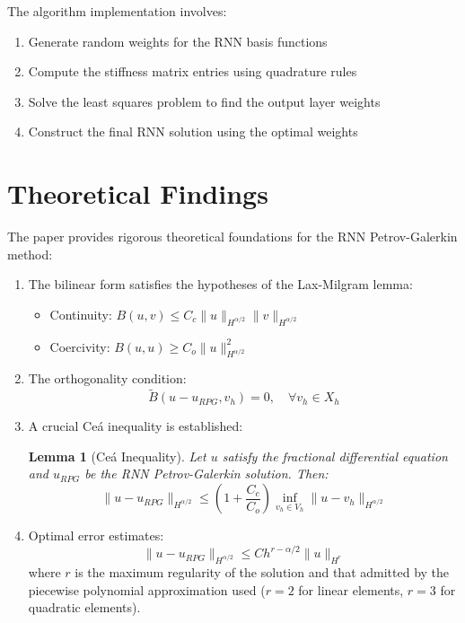\documentclass[11pt]{article}
\newtheorem{lemma}{Lemma}
\begin{document}
The algorithm implementation involves:
\begin{enumerate}
    \item Generate random weights for the RNN basis functions
    \item Compute the stiffness matrix entries using quadrature rules
    \item Solve the least squares problem to find the output layer weights
    \item Construct the final RNN solution using the optimal weights
\end{enumerate}

\section{Theoretical Findings}

The paper provides rigorous theoretical foundations for the RNN Petrov-Galerkin method:

\begin{enumerate}
    \item The bilinear form satisfies the hypotheses of the Lax-Milgram lemma:
    \begin{itemize}
        \item Continuity: $B(u,v) \leq C_c \|u\|_{H^{\alpha/2}} \|v\|_{H^{\alpha/2}}$
        \item Coercivity: $B(u,u) \geq C_o \|u\|^2_{H^{\alpha/2}}$
    \end{itemize}
    
    \item The orthogonality condition:
    \begin{equation}
    \tilde{B}(u-u_{RPG}, v_h) = 0, \quad \forall v_h \in X_h
    \end{equation}
    
    \item A crucial Ceá inequality is established:
    \begin{lemma}[Ceá Inequality]
    Let $u$ satisfy the fractional differential equation and $u_{RPG}$ be the RNN Petrov-Galerkin solution. Then:
    \begin{equation}
    \|u-u_{RPG}\|_{H^{\alpha/2}} \leq \left(1 + \frac{C_c}{C_o}\right) \inf_{v_h \in V_h} \|u-v_h\|_{H^{\alpha/2}}
    \end{equation}
    \end{lemma}
    
    \item Optimal error estimates:
    \begin{equation}
    \|u-u_{RPG}\|_{H^{\alpha/2}} \leq Ch^{r-\alpha/2}\|u\|_{H^r}
    \end{equation}
    where $r$ is the maximum regularity of the solution and that admitted by the piecewise polynomial approximation used ($r=2$ for linear elements, $r=3$ for quadratic elements).
\end{enumerate}
\end{document}
